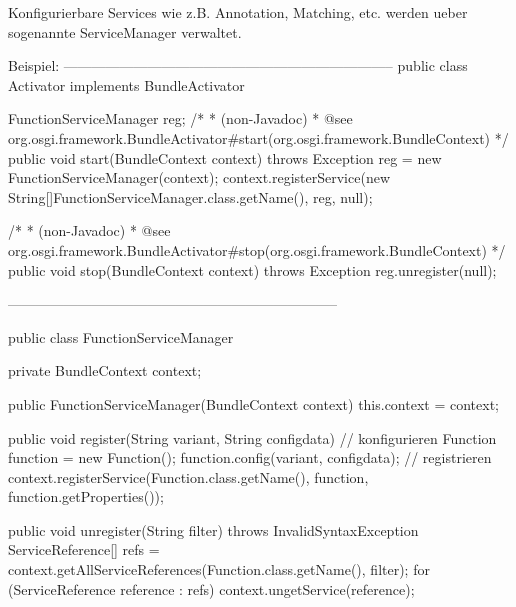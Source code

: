 Konfigurierbare Services wie z.B. Annotation, Matching, etc. werden ueber sogenannte ServiceManager verwaltet.

Beispiel:
-----------------------------------------------------------------------
public class Activator implements BundleActivator {

	FunctionServiceManager reg;
	/*
	 * (non-Javadoc)
	 * @see org.osgi.framework.BundleActivator#start(org.osgi.framework.BundleContext)
	 */
	public void start(BundleContext context) throws Exception {
		reg = new FunctionServiceManager(context);
		context.registerService(new String[]{FunctionServiceManager.class.getName()}, reg, null);
	}

	/*
	 * (non-Javadoc)
	 * @see org.osgi.framework.BundleActivator#stop(org.osgi.framework.BundleContext)
	 */
	public void stop(BundleContext context) throws Exception {
		reg.unregister(null);
	}
}

-----------------------------------------------------------------------


public class FunctionServiceManager {
	
	private BundleContext context;
	
	public FunctionServiceManager(BundleContext context) {
		this.context = context;
	}

	public void register(String variant, String configdata) {
		// konfigurieren
		Function function = new Function();
		function.config(variant, configdata);
		// registrieren
		context.registerService(Function.class.getName(), function, function.getProperties());
	}
	
	public void unregister(String filter) throws InvalidSyntaxException {
		ServiceReference[] refs = context.getAllServiceReferences(Function.class.getName(), filter);
		for (ServiceReference reference : refs)
			context.ungetService(reference);
	}
}



